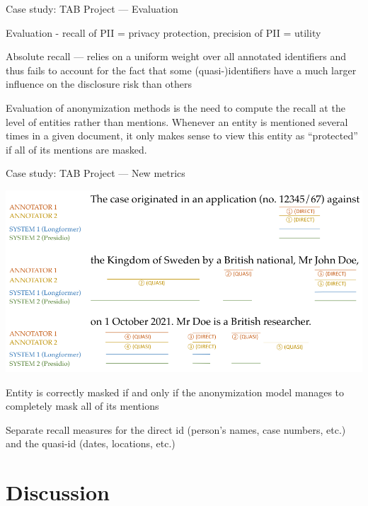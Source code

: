 \documentclass[12pt,aspectratio=169,handout]{beamer}
\begin{document}
\begin{frame}{Case study: TAB Project --- Evaluation}

Evaluation - recall of PII = privacy protection, precision of PII = utility

Absolute recall --- relies on a uniform weight over all annotated identifiers and thus fails to account for the fact that some (quasi-)identifiers have a much larger influence on the disclosure risk than others

Evaluation of anonymization methods is the need to compute the recall at the level of entities rather than mentions. Whenever an entity is mentioned several times in a given document, it only makes sense to view this entity as “protected” if all of its mentions are masked.

\end{frame}


\begin{frame}{Case study: TAB Project --- New metrics}

\includegraphics[width=0.7\linewidth]{img/tab3}

Entity is correctly masked if and only if the anonymization model manages to completely mask all of its mentions

Separate recall measures for the direct id (person’s names, case numbers, etc.) and the quasi-id (dates, locations, etc.)

\end{frame}

\section{Discussion}
\end{document}
